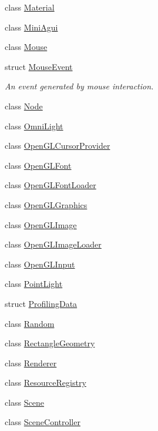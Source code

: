 \begin{DoxyCompactItemize}
class \mbox{\hyperlink{classec_1_1_material}{Material}}
\item 
class \mbox{\hyperlink{classec_1_1_mini_agui}{Mini\+Agui}}
\item 
class \mbox{\hyperlink{classec_1_1_mouse}{Mouse}}
\item 
struct \mbox{\hyperlink{structec_1_1_mouse_event}{Mouse\+Event}}
\begin{DoxyCompactList}\small\item\em An event generated by mouse interaction. \end{DoxyCompactList}\item 
class \mbox{\hyperlink{classec_1_1_node}{Node}}
\item 
class \mbox{\hyperlink{classec_1_1_omni_light}{Omni\+Light}}
\item 
class \mbox{\hyperlink{classec_1_1_open_g_l_cursor_provider}{Open\+G\+L\+Cursor\+Provider}}
\item 
class \mbox{\hyperlink{classec_1_1_open_g_l_font}{Open\+G\+L\+Font}}
\item 
class \mbox{\hyperlink{classec_1_1_open_g_l_font_loader}{Open\+G\+L\+Font\+Loader}}
\item 
class \mbox{\hyperlink{classec_1_1_open_g_l_graphics}{Open\+G\+L\+Graphics}}
\item 
class \mbox{\hyperlink{classec_1_1_open_g_l_image}{Open\+G\+L\+Image}}
\item 
class \mbox{\hyperlink{classec_1_1_open_g_l_image_loader}{Open\+G\+L\+Image\+Loader}}
\item 
class \mbox{\hyperlink{classec_1_1_open_g_l_input}{Open\+G\+L\+Input}}
\item 
class \mbox{\hyperlink{classec_1_1_point_light}{Point\+Light}}
\item 
struct \mbox{\hyperlink{structec_1_1_profiling_data}{Profiling\+Data}}
\item 
class \mbox{\hyperlink{classec_1_1_random}{Random}}
\item 
class \mbox{\hyperlink{classec_1_1_rectangle_geometry}{Rectangle\+Geometry}}
\item 
class \mbox{\hyperlink{classec_1_1_renderer}{Renderer}}
\item 
class \mbox{\hyperlink{classec_1_1_resource_registry}{Resource\+Registry}}
\item 
class \mbox{\hyperlink{classec_1_1_scene}{Scene}}
\item 
class \mbox{\hyperlink{classec_1_1_scene_controller}{Scene\+Controller}}
\item 

\end{DoxyCompactItemize}
